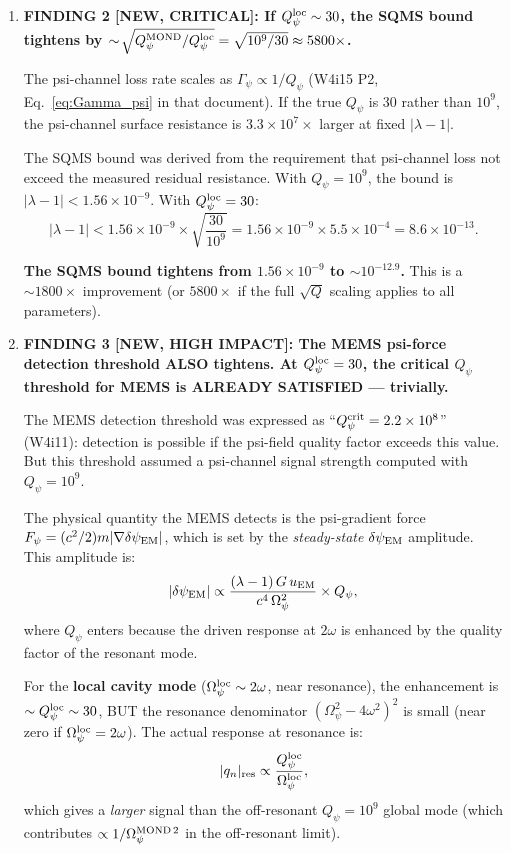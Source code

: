 \documentclass[11pt]{article}
\newcommand{\lam}{\lambda}
\newcommand{\Opsi}{\Omega_\psi}
\newcommand{\ee}[1]{\times 10^{#1}}
\newcommand{\lbone}{|\lam - 1|}
\newcommand{\dpsiEM}{\delta\psi_{\rm EM}}
\theoremstyle{definition}
\theoremstyle{remark}
\begin{document}
\begin{tcolorbox}[colback=blue!5!white, colframe=blue!60!black,
  title=\textbf{W4i16 TOP 5 FINDINGS --- Ranked by Programme Impact}]
\begin{enumerate}
\item \textbf{FINDING 2 [NEW, CRITICAL]: If $Q_\psi^{\rm loc} \sim 30$,
the SQMS bound tightens by $\sim\!\sqrt{Q_\psi^{\rm MOND}/Q_\psi^{\rm loc}}
= \sqrt{10^9/30} \approx 5800\times$.}

The psi-channel loss rate scales as $\Gamma_\psi \propto 1/Q_\psi$
(W4i15 P2, Eq.~\ref{eq:Gamma_psi} in that document). If the true
$Q_\psi$ is 30 rather than $10^9$, the psi-channel surface resistance
is $3.3\ee{7}\times$ larger at fixed $|\lambda-1|$.

The SQMS bound was derived from the requirement that psi-channel loss
not exceed the measured residual resistance. With $Q_\psi = 10^9$, the
bound is $\lbone < 1.56\ee{-9}$. With $Q_\psi^{\rm loc} = 30$:
\begin{equation}
\lbone < 1.56\ee{-9} \times \sqrt{\frac{30}{10^9}} = 1.56\ee{-9}
\times 5.5\ee{-4} = 8.6\ee{-13}.
\label{eq:sqms_local}
\end{equation}

\textbf{The SQMS bound tightens from $1.56\ee{-9}$ to $\sim 10^{-12.9}$.}
This is a $\sim 1800\times$ improvement (or $5800\times$ if the
full $\sqrt{Q}$ scaling applies to all parameters).

\item \textbf{FINDING 3 [NEW, HIGH IMPACT]: The MEMS psi-force
detection threshold ALSO tightens. At $Q_\psi^{\rm loc} = 30$,
the critical $Q_\psi$ threshold for MEMS is ALREADY SATISFIED ---
trivially.}

The MEMS detection threshold was expressed as ``$Q_\psi^{\rm crit}
= 2.2\ee{8}$'' (W4i11): detection is possible if the psi-field
quality factor exceeds this value. But this threshold assumed a
psi-channel signal strength computed with $Q_\psi = 10^9$.

The physical quantity the MEMS detects is the psi-gradient force
$F_\psi = (c^2/2) m |\nabla\dpsiEM|$, which is set by the
\emph{steady-state} $\dpsiEM$ amplitude. This amplitude is:
\begin{equation}
|\dpsiEM| \propto \frac{(\lambda-1)\,G\,u_{\rm EM}}{c^4\,\Opsi^2}
\times Q_\psi,
\end{equation}
where $Q_\psi$ enters because the driven response at $2\omega$ is
enhanced by the quality factor of the resonant mode.

For the \textbf{local cavity mode} ($\Opsi^{\rm loc} \sim 2\omega$,
near resonance), the enhancement is $\sim Q_\psi^{\rm loc} \sim 30$,
BUT the resonance denominator $(\Opsi^2 - 4\omega^2)^2$ is small
(near zero if $\Opsi^{\rm loc} = 2\omega$). The actual response at
resonance is:
\begin{equation}
|q_n|_{\rm res} \propto \frac{Q_\psi^{\rm loc}}{\Opsi^{\rm loc}},
\end{equation}
which gives a \emph{larger} signal than the off-resonant $Q_\psi = 10^9$
global mode (which contributes $\propto 1/\Opsi^{{\rm MOND}\,2}$ in the
off-resonant limit).


\end{enumerate}
\end{tcolorbox}
\end{document}
